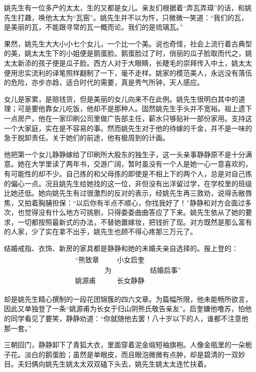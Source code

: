 \par 姚先生有一位多产的太太，生的又都是女儿。亲友们根据着“弄瓦弄璋”的话，和姚先生打趣，唤他太太为“瓦窑”。姚先生并不以为忤，只微微一笑道：“我们的瓦，是美丽的瓦，不能跟寻常的瓦一概而论。我们的是琉璃瓦。”
\par 果然，姚先生大大小小七个女儿，一个比一个美。说也奇怪，社会上流行着古典型的美，姚太太生下的小姐便是鹅蛋脸。鹅蛋脸过了时，俏丽的瓜子脸取而代之，姚太太新添的孩子便是瓜子脸。西方人对于大眼睛，长睫毛的崇拜传入中土，姚太太便用忠实流利的译笔照样翻制了一下，毫不走样。姚家的模范美人，永远没有落伍的危险，亦步亦趋，适合时代的需要，真是秀气所钟，天人感应。
\par 女儿是家累，是赔钱货，但是美丽的女儿向来不在此例。姚先生很明白其中的道理；可是要他靠女儿吃饭，他却不是那种人。固然姚先生手头并不宽裕。祖上遗下一点房产，他在一家印刷公司里做广告部主任，薪水只够贴补一部份家用。支持这一个大家庭，实在是不容易的事。然而姚先生对于他的待嫁的千金，并不是一味的急于脱卸责任。关于她们的前途，他有极周到的计画。
\par 他把第一个女儿静静嫁给了印刷所大股东的独生子，这一头亲事静静原不是十分满意。她在大学里读了两年书，交游广阔，暂时虽没有一个人是她一心一意喜欢的，有可能性的却不少。自己拣的和父母拣的即使是不相上下的两个人，总是对自己拣的偏心一点。况且姚先生给她找的这一位，非但没有出洋留过学，在学校里的班级比她还低。她向姚先生有过很激烈的反对的表示，经姚先生再三敦劝，说得舌敝唇焦，又拍着胸脯担保：“以后你有半点不顺心，你找我好了！”静静和对方会面过多次，也觉得没有什么地方可挑剔，只得委委曲曲答应了下来。姚先生依从了她的要求，一切都按照最新式的办法，不替她置嫁妆，把钱折了现。对方既然是那么富有的人家，少了实在拿不出手，姚先生也顾不得心疼那三万元了。
\par 结婚戒指、衣饰、新房的家具都是静静和她的未婚夫亲自选择的。报上登的：
\begin{gather*}
    \begin{matrix}
    \text{“熊致章} &    &\text{小女启奎}&  \\
            & \text{为} &        &\text{结婚启事”}\\
            \text{姚源甫} &    & \text{长女静静}&  
    \end{matrix}
\end{gather*}
\par 却是姚先生精心撰制的一段花团锦簇的四六文章。为篇幅所限，他未能畅所欲言，因此又单独登了一条“姚源甫为长女于归山阴熊氏敬告亲友”。启奎嫌他噜苏，怕他的同学看见了要笑，静静劝道：“你就随他去罢！八十岁以下的人，谁都不注意他那一套。”
\par 三朝回门，静静卸下了青狐大衣，里面穿着泥金缎短袖旗袍。人像金瓶里的一朵栀子花。淡白的鹅蛋脸；虽然是单眼皮，而且眼泡微微有点肿，却是碧清的一双妙目。夫妇俩向姚先生姚太太双双磕下头去，姚先生姚太太连忙扶着。
